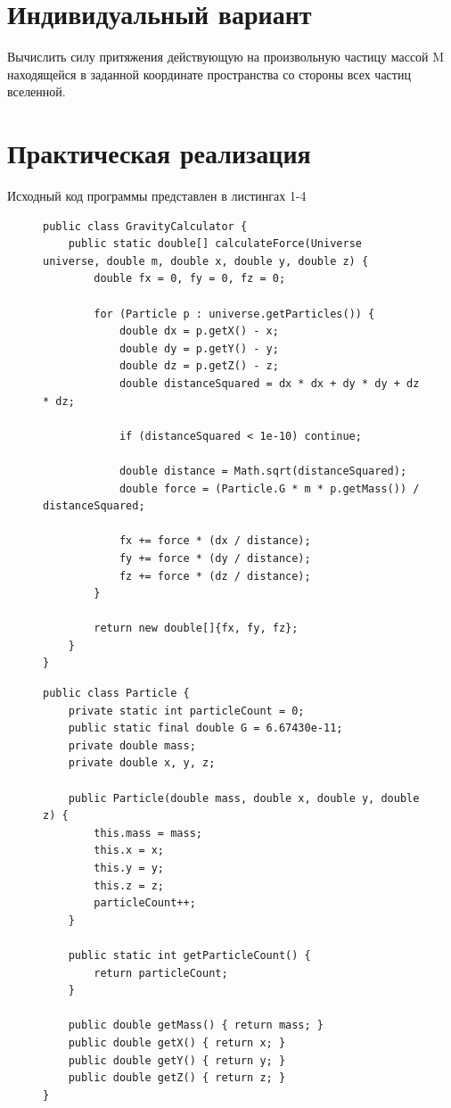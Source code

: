 \documentclass[a4paper, 14pt]{extarticle}
\begin{document}
\section{Индивидуальный вариант}\label{Sect::task}
\par
Вычислить силу притяжения действующую на произвольную частицу массой M находящейся в заданной координате пространства со стороны всех частиц вселенной.
\section {Практическая реализация}
Исходный код программы представлен в листингах 1-4
\begin{figure}[!htb]
\begin{lstlisting}[language={},caption={класс},label={lst:code1}]
public class GravityCalculator {
    public static double[] calculateForce(Universe universe, double m, double x, double y, double z) {
        double fx = 0, fy = 0, fz = 0;

        for (Particle p : universe.getParticles()) {
            double dx = p.getX() - x;
            double dy = p.getY() - y;
            double dz = p.getZ() - z;
            double distanceSquared = dx * dx + dy * dy + dz * dz;

            if (distanceSquared < 1e-10) continue;

            double distance = Math.sqrt(distanceSquared);
            double force = (Particle.G * m * p.getMass()) / distanceSquared;

            fx += force * (dx / distance);
            fy += force * (dy / distance);
            fz += force * (dz / distance);
        }

        return new double[]{fx, fy, fz};
    }
}

\end{lstlisting}
\end{figure}
\begin{figure}[!htb]
\begin{lstlisting}[language={},caption={класс},label={lst:code2}]
public class Particle {
    private static int particleCount = 0;
    public static final double G = 6.67430e-11;
    private double mass;
    private double x, y, z;

    public Particle(double mass, double x, double y, double z) {
        this.mass = mass;
        this.x = x;
        this.y = y;
        this.z = z;
        particleCount++;
    }

    public static int getParticleCount() {
        return particleCount;
    }

    public double getMass() { return mass; }
    public double getX() { return x; }
    public double getY() { return y; }
    public double getZ() { return z; }
}

\end{lstlisting}
\end{figure}
\end{document}
